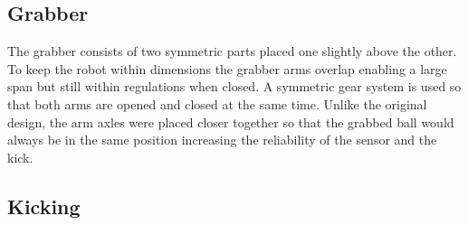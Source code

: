 \documentclass[a4paper,12pt]{article}
\begin{document}
\subsection{Grabber}
The grabber consists of two symmetric parts placed one slightly above the other. To keep the robot within dimensions the grabber arms overlap enabling a large span but still within regulations when closed. A symmetric gear system is used so that both arms are opened and closed at the same time. Unlike the original design, the arm axles were placed closer together so that the grabbed ball would always be in the same position increasing the reliability of the sensor and the kick.

\subsection{Kicking}

\end{document}
